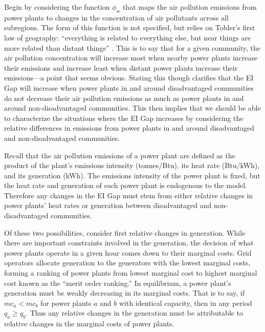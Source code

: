 Begin by considering the function $\phi_w$ that maps the air pollution emissions from power plants to changes in the concentration of air pollutants across all subregions. The form of this function is not specified, but relies on Tobler's first law of geography: ``everything is related to everything else, but near things are more related than distant things'' \citep{tobler1970computer}. This is to say that for a given community, the air pollution concentration will increase most when nearby power plants increase their emissions and increase least when distant power plants increase their emissions---a point that seems obvious. Stating this though clarifies that the EI Gap will increase when power plants in and around disadvantaged communities do not decrease their air pollution emissions as much as power plants in and around non-disadvantaged communities. This then implies that we should be able to characterize the situations where the EI Gap increases by considering the relative differences in emissions from power plants in and around disadvantaged and non-disadvantaged communities. 

Recall that the air pollution emissions of a power plant are defined as the product of the plant's emissions intensity (tonnes/Btu), its heat rate (Btu/kWh), and its generation (kWh). The emissions intensity of the power plant is fixed, but the heat rate and generation of each power plant is endogenous to the model. Therefore any changes in the EI Gap must stem from either relative changes in power plants' heat rates or generation between disadvantaged and non-disadvantaged communities. 

Of these two possibilities, consider first relative changes in generation. While there are important constraints involved in the generation, the decision of what power plants operate in a given hour comes down to their marginal costs. Grid operators allocate generation to the generators with the lowest marginal costs, forming a ranking of power plants from lowest marginal cost to highest marginal cost known as the ``merit order ranking.'' In equilibrium, a power plant's generation must be weakly decreasing in its marginal costs. That is to say, if $mc_{a} < mc_{b}$ for power plants $a$ and $b$ with identical capacity, then in any period $q_a \geq q_b$. Thus any relative changes in the generation must be attributable to relative changes in the marginal costs of power plants. 

